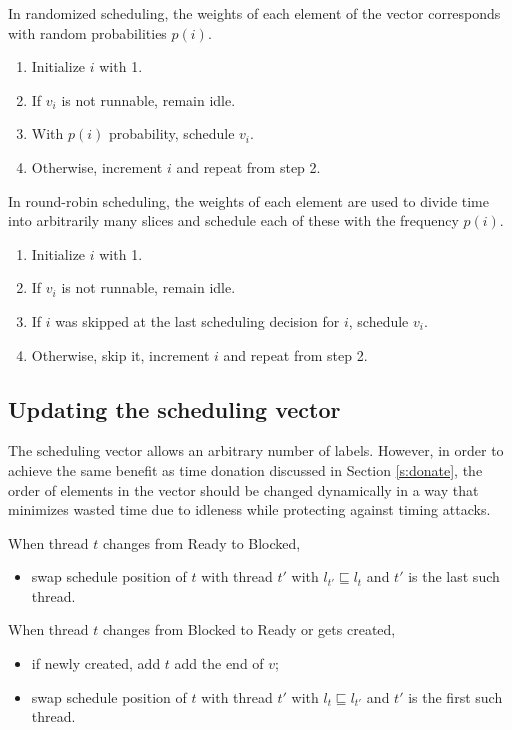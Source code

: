 \documentclass[10pt,preprint]{sigplanconf}
\begin{document}
In randomized scheduling, the weights of each element of the vector corresponds with random probabilities $p(i)$.

\begin{enumerate}
  \item Initialize $i$ with 1.
  \item If $v_i$ is not runnable, remain idle.
  \item With $p(i)$ probability, schedule $v_i$.
  \item Otherwise, increment $i$ and repeat from step 2.
\end{enumerate}

In round-robin scheduling, the weights of each element are used to divide time into arbitrarily many slices and schedule each of these with the frequency $p(i)$.

\begin{enumerate}
  \item Initialize $i$ with 1.
  \item If $v_i$ is not runnable, remain idle.
  \item If $i$ was skipped at the last scheduling decision for $i$, schedule $v_i$.
  \item Otherwise, skip it, increment $i$ and repeat from step 2.
\end{enumerate}

\subsection{Updating the scheduling vector}

The scheduling vector allows an arbitrary number of labels.  However, in order to achieve the same benefit as time donation discussed in Section \ref{s:donate}, the order of elements in the vector should be changed dynamically in a way that minimizes wasted time due to idleness while protecting against timing attacks.

When thread $t$ changes from Ready to Blocked,

\begin{itemize}
  \item swap schedule position of $t$ with thread $t'$ with $l_{t'} \sqsubseteq l_t$ and $t'$ is the last such thread.
\end{itemize}

When thread $t$ changes from Blocked to Ready or gets created,

\begin{itemize}
  \item if newly created, add $t$ add the end of $v$;
  \item swap schedule position of $t$ with thread $t'$ with $l_{t} \sqsubseteq l_{t'}$ and $t'$ is the first such thread.
\end{itemize}
\end{document}
